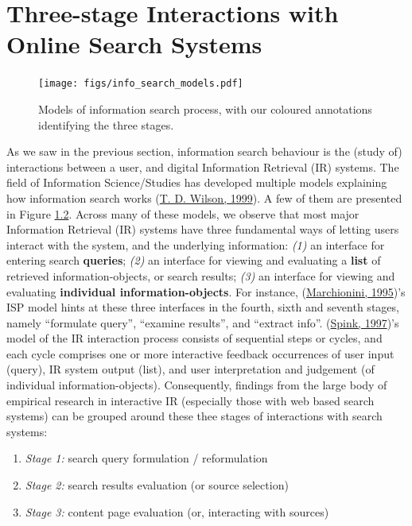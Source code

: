 \documentclass[a4paper, nobind]{templates/ociamthesis}
\begin{document}
\hypertarget{sec:bg_search_3_stage}{%
\section{Three-stage Interactions with Online Search Systems}\label{sec:bg_search_3_stage}}

\begin{figure}
\hypertarget{fig_info_search_models}{%
\centering
\texttt{[image: figs/info\_search\_models.pdf]}
\caption{Models of information search process, with our coloured annotations
identifying the three stages.}\label{fig_info_search_models}
}
\end{figure}

As we saw in the previous section, information search behaviour is the
(study of) interactions between a user, and digital Information
Retrieval (IR) systems. The field of Information Science/Studies has
developed multiple models explaining how information search works
(\protect\hyperlink{ref-wilson1999models}{T. D. Wilson, 1999}). A few of them are presented in Figure
\protect\hyperlink{fig_info_search_models}{1.2}. Across many of these models, we
observe that most major Information Retrieval (IR) systems have three
fundamental ways of letting users interact with the system, and the
underlying information: \emph{(1)} an interface for entering search
\textbf{queries}; \emph{(2)} an interface for viewing and evaluating a \textbf{list} of
retrieved information-objects, or search results; \emph{(3)} an interface for
viewing and evaluating \textbf{individual information-objects}. For instance,
(\protect\hyperlink{ref-marchionini1995information}{Marchionini, 1995})'s ISP model hints at these three
interfaces in the fourth, sixth and seventh stages, namely ``formulate
query'', ``examine results'', and ``extract info''. (\protect\hyperlink{ref-spink1997study}{Spink, 1997})'s model
of the IR interaction process consists of sequential steps or cycles,
and each cycle comprises one or more interactive feedback occurrences of
user input (query), IR system output (list), and user interpretation and
judgement (of individual information-objects). Consequently, findings
from the large body of empirical research in interactive IR (especially
those with web based search systems) can be grouped around these thee
stages of interactions with search systems:

\begin{enumerate}
\def\labelenumi{\arabic{enumi}.}
\item
  \emph{Stage 1:} search query formulation / reformulation
\item
  \emph{Stage 2:} search results evaluation (or source selection)
\item
  \emph{Stage 3:} content page evaluation (or, interacting with sources)
\end{enumerate}
\end{document}
